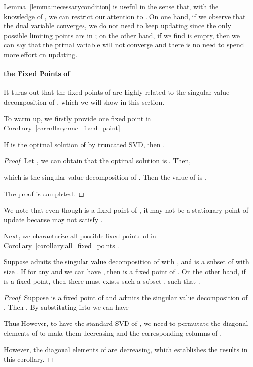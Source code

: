 Lemma~\ref{lemma:necessarycondition} is useful in the sense that, with the knowledge of , we can restrict our attention to . On one hand, if we observe that the dual variable converges, we do not need to keep updating since the only possible limiting points are in ; on the other hand, if we find  is empty, then we can say that the primal variable will not converge and there is no need to spend more effort on updating.


\paragraph{the Fixed Points of }

It turns out that the fixed points of  are highly related to the singular value decomposition of , which we will show in this section.

To warm up, we firstly provide one fixed point in Corollary~\ref{corrollary:one_fixed_point}.
\begin{corollary}\label{corrollary:one_fixed_point}
If  is the optimal solution of  by truncated SVD, then .
\end{corollary}

\begin{proof}
Let , we can obtain that the optimal solution is . Then,

which is the singular value decomposition of . Then the value of  is .

The proof is completed.
\end{proof}

We note that even though  is a fixed point of , it may not be a stationary point of  update because  may not satisfy .


Next, we characterize all possible fixed points of  in Corollary~\ref{corollary:all_fixed_points}.

\begin{corollary}\label{corollary:all_fixed_points}
Suppose  admits the singular value decomposition of  with , and  is a subset of  with size . If for any  and  we can have , then  is a fixed point of . On the other hand, if  is a fixed point, then there must exists such a subset , such that .
\end{corollary}
\begin{proof}
Suppose  is a fixed point of  and  admits the singular value decomposition of . Then .
By substituting into  we can have

Thus 
However, to have the standard SVD of , we need to permutate the diagonal elements of  to make them decreasing and the corresponding columns of .

However, the diagonal elements of  are decreasing, which establishes the results in this corollary.
\end{proof}

